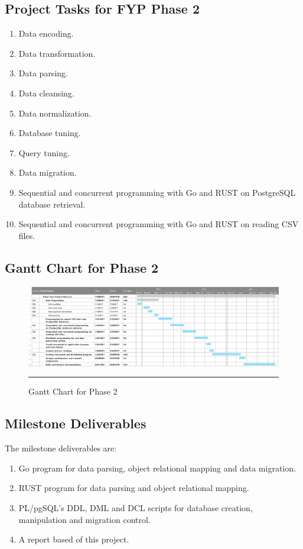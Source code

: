 \subsection{Project Tasks for FYP Phase 2}

\begin{enumerate}[topsep=0pt,itemsep=-1ex,partopsep=1ex,parsep=1.5ex]
	\item Data encoding.
	\item Data transformation. 
	\item Data parsing. 
	\item Data cleansing. 
	\item Data normalization.
	\item Database tuning. 
	\item Query tuning. 
	\item Data migration.
	\item Sequential and concurrent programming with Go and RUST on PostgreSQL database retrieval.
	\item Sequential and concurrent programming with Go and RUST on reading CSV files.
	
\end{enumerate}

\begin{landscape}
	\subsection{Gantt Chart for Phase 2}
	\begin{figure}[H]
		\centering
		\includegraphics[width=1.5\textwidth]{Figure/Gantt2.png}
		\rule{35em}{0.5pt}
		\caption[Gantt Chart for Phase 2]{Gantt Chart for Phase 2}
	\end{figure}
\end{landscape}


\subsection{Milestone Deliverables}
The milestone deliverables are:

\begin{enumerate}[topsep=0pt,itemsep=-1ex,partopsep=1ex,parsep=1ex]
\item Go program for data parsing, object relational mapping and data migration. 
\item RUST program for data parsing and object relational mapping.
\item PL/pgSQL's DDL, DML and DCL scripts for database creation, manipulation and migration control.
\item A report based of this project. 
\end{enumerate}

